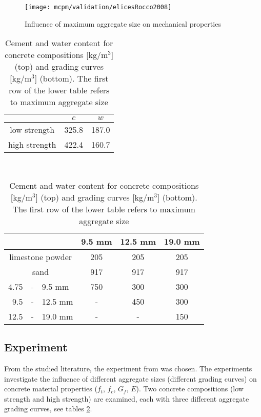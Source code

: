 \begin{figure}[htbp]
	\centering
	\texttt{[image: mcpm/validation/elicesRocco2008]}
	\caption[Influence of maximum aggregate size on mechanical properties]{Influence of maximum aggregate size on mechanical properties \cite{ElicesRocco2008a}}
	\label{figMCPMValidationMaxAggregSizeInfluenceElicesRocco}
\end{figure}



\begin{table}[htbp]
	\centering
	\caption[Concrete compositions]{Cement and water content for concrete compositions [kg/m$^3$] (top) and grading curves [kg/m$^3$] (bottom). The first row of the lower table refers to maximum aggregate size}
	\begin{tabular}{|c|c|c|}
		\hline
		 & $c$ & $w$ \\
		\hline\hline
		low strength  & 325{.}8 & 187{.}0 \\
		\hline
		high strength & 422{.}4 & 160{.}7 \\
		\hline
	\end{tabular}
	\\
	\vspace{1em}
	\begin{tabular}{|rcl|c|c|c|}
		\hline
		     &   &         & 9{.}5 mm & 12{.}5 mm & 19{.}0 mm \\
		\hline\hline
		\multicolumn{3}{|c|}{limestone powder} & 205 & 205 & 205 \\
		\hline
		\multicolumn{3}{|c|}{sand} & 917 & 917 & 917 \\
		\hline
		4.75 & - & 9.5 mm  & 750      & 300       & 300 \\
		\hline
		9.5  & - & 12.5 mm &  -       & 450       & 300 \\
		\hline
		12.5 & - & 19.0 mm &  -       &  -        & 150 \\
		\hline
	\end{tabular}
	\label{tabMCPMValidationBeygiExperiment}
\end{table}

\subsection{Experiment \cite{BeygiEtAl2014a,BeygiEtAl2014b,NikbinEtAl2014a}}

From the studied literature, the experiment from \cite{BeygiEtAl2014a,BeygiEtAl2014b,NikbinEtAl2014a} was chosen.
The experiments investigate the influence of different aggregate sizes (different grading curves) on concrete material properties ($f_t$, $f_c$, $G_f$, $E$).
Two concrete compositions (low strength and high strength) are examined, each with three different aggregate grading curves, see tables \ref{tabMCPMValidationBeygiExperiment}.

